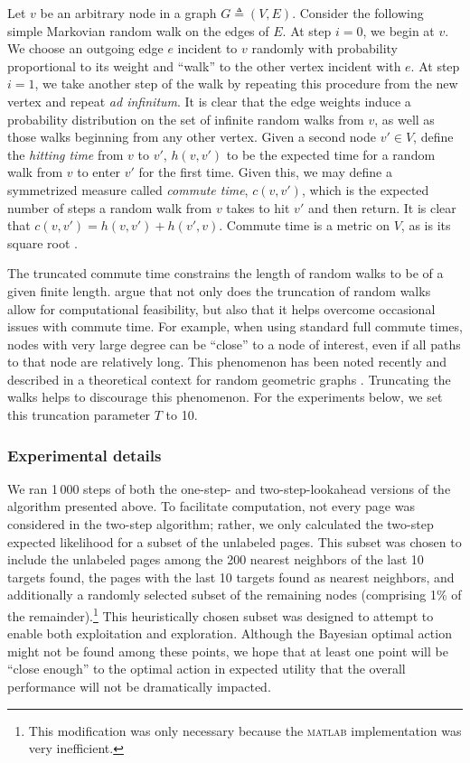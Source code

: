 \documentclass{article}
\newcommand{\deq}{\triangleq}
\begin{document}
Let $v$ be an arbitrary node in a graph $G \deq (V, E)$.  Consider the
following simple Markovian random walk on the edges of $E$.  At step
$i = 0$, we begin at $v$.  We choose an outgoing edge $e$ incident to
$v$ randomly with probability proportional to its weight and ``walk''
to the other vertex incident with $e$.  At step $i = 1$, we take
another step of the walk by repeating this procedure from the new
vertex and repeat \emph{ad infinitum}.  It is clear that the edge
weights induce a probability distribution on the set of infinite
random walks from $v$, as well as those walks beginning from any other
vertex.  Given a second node $v' \in V$, define the \emph{hitting
  time} from $v$ to $v'$, $h(v, v')$ to be the expected time for a
random walk from $v$ to enter $v'$ for the first time.  Given this, we
may define a symmetrized measure called \emph{commute time}, $c(v,
v')$, which is the expected number of steps a random walk from $v$
takes to hit $v'$ and then return.  It is clear that $c(v, v') = h(v,
v') + h(v', v)$.  Commute time is a metric on $V$, as is its square
root \citep{fouss}.

The truncated commute time constrains the length of random walks to be
of a given finite length. \citet{granch} argue that not only does the
truncation of random walks allow for computational feasibility, but
also that it helps overcome occasional issues with commute time.  For
example, when using standard full commute times, nodes with very large
degree can be ``close'' to a node of interest, even if all paths to
that node are relatively long.  This phenomenon has been noted
recently and described in a theoretical context for random geometric
graphs \citep{commutetimedegree}.  Truncating the walks helps to
discourage this phenomenon.  For the experiments below, we set this
truncation parameter $T$ to 10.

\subsubsection{Experimental details}

We ran 1\,000 steps of both the one-step- and two-step-lookahead
versions of the algorithm presented above.  To facilitate computation,
not every page was considered in the two-step algorithm; rather, we
only calculated the two-step expected likelihood for a subset of the
unlabeled pages.  This subset was chosen to include the unlabeled
pages among the 200 nearest neighbors of the last 10 targets found,
the pages with the last 10 targets found as nearest neighbors, and
additionally a randomly selected subset of the remaining nodes
(comprising 1\% of the remainder).\footnote{This modification was only
  necessary because the \textsc{matlab} implementation was very
  inefficient.}  This heuristically chosen subset was designed to
attempt to enable both exploitation and exploration.  Although the
Bayesian optimal action might not be found among these points, we hope
that at least one point will be ``close enough'' to the optimal action
in expected utility that the overall performance will not be
dramatically impacted.
\end{document}
